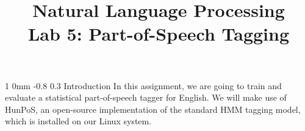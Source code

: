 \documentclass[11pt]{article}
\title{{\LARGE Natural Language Processing}\\[1.5mm]{\large Lab 5: Part-of-Speech Tagging}}
\author{}
\date{} %
\makeatletter
\newcommand{\newsec}[2]{\section{#1}\label{sec:#2}\noindent}
\renewcommand{\section}{\@startsection
{section}%
{1}%
{0mm}%
{-0.8\baselineskip}%
{0.3\baselineskip}%
{\bfseries\large}}%
\makeatother
\begin{document}
 

\maketitle
\vspace{-2mm} \newsec{Introduction}{intro}%
In this assignment, we are going to train and evaluate a statistical
part-of-speech tagger for English. We will make use of HunPoS, an
open-source implementation of the standard HMM tagging model, which is
installed on our Linux system.
\end{document}
